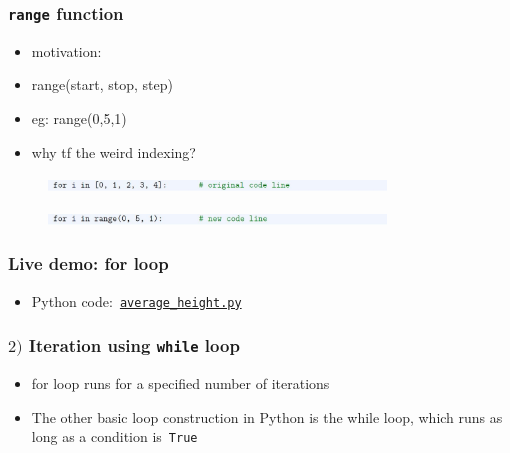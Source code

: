\documentclass[english,14pt]{beamer}
\begin{document}

\begin{frame}[fragile]

\frametitle{\texttt{range} function}

\begin{itemize}
	\item motivation: 
	\item range(start, stop, step)
	\item eg: range(0,5,1)
	\item why tf the weird indexing?
\end{itemize}

\begin{figure}[ht]
	\centering
	\includegraphics[width=0.8\textwidth]{figures/LLp63a}
\end{figure}

\begin{figure}[ht]
	\centering
	\includegraphics[width=0.8\textwidth]{figures/LLp63b}
\end{figure}

\end{frame}


\begin{frame}[fragile]

\frametitle{Live demo: for loop}

\begin{itemize}
	\item Python code:~\href{https://github.com/slgit/prog4comp_2/blob/master/py36-src/average_height.py}{\texttt{average\_height.py}}
\end{itemize}

\end{frame}


\begin{frame}[fragile]

\frametitle{$2)$ Iteration using \texttt{while} loop}

\begin{itemize}
	\item for loop runs for a specified number of iterations
	\item The other basic loop construction in Python is the while loop, which runs as long as a condition is~\texttt{True}

\end{itemize}

\end{frame}
\end{document}
